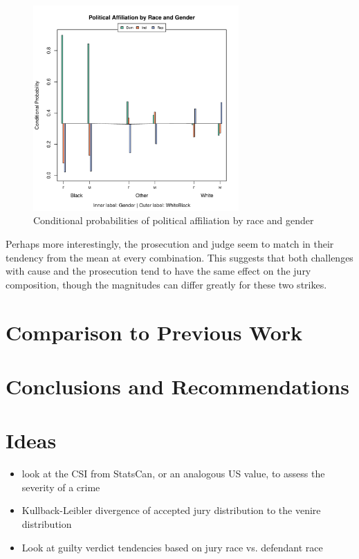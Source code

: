 \documentclass{article}
\begin{document}
\begin{figure}[!h]
  \centering
  \includegraphics[width=0.7\textwidth]{Plots/RaceGenderPolit}
  \caption{Conditional probabilities of political affiliation by race and gender}
  \label{fig:racepolitics}
\end{figure}

Perhaps more interestingly, the prosecution and judge seem to match in their tendency from the mean at every combination. This
suggests that both challenges with cause and the prosecution tend to have the same effect on the jury composition, though the
magnitudes can differ greatly for these two strikes.

\section{Comparison to Previous Work} \label{sec:comparison}

\section{Conclusions and Recommendations} \label{sec:conclusion}

\section{Ideas}
\begin{itemize}
\item look at the CSI from StatsCan, or an analogous US value, to assess the severity of a crime
\item Kullback-Leibler divergence of accepted jury distribution to the venire distribution
\item Look at guilty verdict tendencies based on jury race vs. defendant race
\end{itemize}


 
\end{document}
